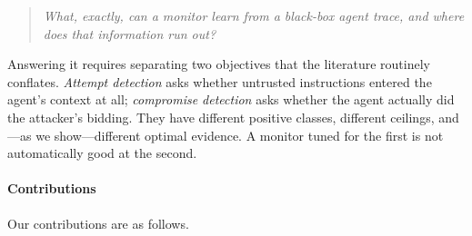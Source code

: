\documentclass[preprint,12pt,number]{elsarticle}
\theoremstyle{definition}
\begin{document}
\begin{quote}
\emph{What, exactly, can a monitor learn from a black-box agent trace, and where
does that information run out?}
\end{quote}

Answering it requires separating two objectives that the literature routinely
conflates. \emph{Attempt detection} asks whether untrusted instructions entered
the agent's context at all; \emph{compromise detection} asks whether the agent
actually did the attacker's bidding. They have different positive classes,
different ceilings, and---as we show---different optimal evidence. A monitor
tuned for the first is not automatically good at the second.

\paragraph{Contributions} Our contributions are as follows.
\end{document}

